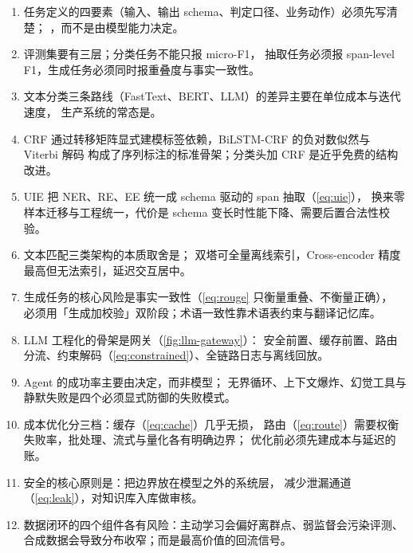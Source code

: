 \begin{keypoint}[本章要点回顾]
\begin{enumerate}
  \item 任务定义的四要素（输入、输出 schema、判定口径、业务动作）必须先写清楚；
        ，而不是由模型能力决定。
  \item 评测集要有三层；分类任务不能只报 micro-F1，
        抽取任务必须报 span-level F1，生成任务必须同时报重叠度与事实一致性。
  \item 文本分类三条路线（FastText、BERT、LLM）的差异主要在单位成本与迭代速度，
        生产系统的常态是。
  \item CRF 通过转移矩阵显式建模标签依赖，BiLSTM-CRF 的负对数似然与 Viterbi 解码
        构成了序列标注的标准骨架；分类头加 CRF 是近乎免费的结构改进。
  \item UIE 把 NER、RE、EE 统一成 schema 驱动的 span 抽取（\cref{eq:uie}），
        换来零样本迁移与工程统一，代价是 schema 变长时性能下降、需要后置合法性校验。
  \item 文本匹配三类架构的本质取舍是；
        双塔可全量离线索引，Cross-encoder 精度最高但无法索引，延迟交互居中。
  \item 生成任务的核心风险是事实一致性（\cref{eq:rouge} 只衡量重叠、不衡量正确），
        必须用「生成加校验」双阶段；术语一致性靠术语表约束与翻译记忆库。
  \item LLM 工程化的骨架是网关（\cref{fig:llm-gateway}）：
        安全前置、缓存前置、路由分流、约束解码（\cref{eq:constrained}）、全链路日志与离线回放。
  \item Agent 的成功率主要由决定，而非模型；
        无界循环、上下文爆炸、幻觉工具与静默失败是四个必须显式防御的失败模式。
  \item 成本优化分三档：缓存（\cref{eq:cache}）几乎无损，
        路由（\cref{eq:route}）需要权衡失败率，批处理、流式与量化各有明确边界；
        优化前必须先建成本与延迟的账。
  \item 安全的核心原则是：把边界放在模型之外的系统层，
        减少泄漏通道（\cref{eq:leak}），对知识库入库做审核。
  \item 数据闭环的四个组件各有风险：主动学习会偏好离群点、弱监督会污染评测、
        合成数据会导致分布收窄；而是最高价值的回流信号。
\end{enumerate}
\end{keypoint}

